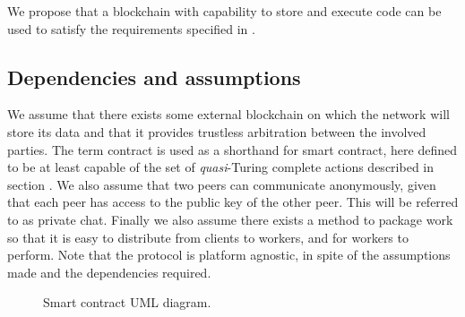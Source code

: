 We propose that a blockchain with capability to store and execute code can be used to satisfy the requirements specified in .

\subsection{Dependencies and assumptions}
\label{sec:res:dependencies}
We assume that there exists some external blockchain on which the network will store its data and that it provides trustless arbitration between the involved parties. The term contract is used as a shorthand for smart contract, here defined to be at least capable of the set of \textit{quasi}-Turing complete actions described in section . We also assume that two peers can communicate anonymously, given that each peer has access to the public key of the other peer. This will be referred to as private chat. Finally we also assume there exists a method to package work so that it is easy to distribute from clients to workers, and for workers to perform.
Note that the protocol is platform agnostic, in spite of the assumptions made and the dependencies required.

\begin{figure}[ht]
\centering
{}
\caption{Smart contract UML diagram.}
\label{fig:res:umal}
\end{figure}

